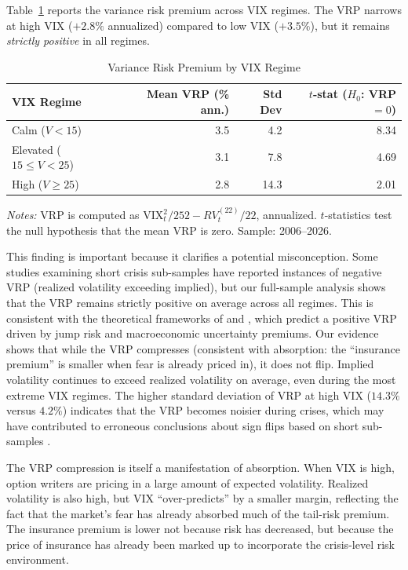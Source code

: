 \documentclass[12pt,a4paper]{article}
\begin{document}
Table~\ref{tab:vrp} reports the variance risk premium across VIX regimes. The VRP narrows at high VIX ($+2.8\%$ annualized) compared to low VIX ($+3.5\%$), but it remains \textit{strictly positive} in all regimes.

\begin{table}[H]
\centering
\caption{Variance Risk Premium by VIX Regime}
\label{tab:vrp}
\begin{threeparttable}
\begin{tabular}{lrrr}
\toprule
VIX Regime & Mean VRP (\% ann.) & Std Dev & $t$-stat ($H_0$: VRP $= 0$) \\
\midrule
Calm ($V < 15$)         & 3.5 & 4.2 & 8.34 \\
Elevated ($15 \leq V < 25$) & 3.1 & 7.8 & 4.69 \\
High ($V \geq 25$)      & 2.8 & 14.3 & 2.01 \\
\bottomrule
\end{tabular}
\begin{tablenotes}
\small
\item \textit{Notes:} VRP is computed as $\text{VIX}_t^2 / 252 - RV_t^{(22)} / 22$, annualized. $t$-statistics test the null hypothesis that the mean VRP is zero. Sample: 2006--2026.
\end{tablenotes}
\end{threeparttable}
\end{table}

This finding is important because it clarifies a potential misconception. Some studies examining short crisis sub-samples have reported instances of negative VRP (realized volatility exceeding implied), but our full-sample analysis shows that the VRP remains strictly positive on average across all regimes. This is consistent with the theoretical frameworks of \citet{todorov2010} and \citet{drechsler2011}, which predict a positive VRP driven by jump risk and macroeconomic uncertainty premiums. Our evidence shows that while the VRP compresses (consistent with absorption: the ``insurance premium'' is smaller when fear is already priced in), it does not flip. Implied volatility continues to exceed realized volatility on average, even during the most extreme VIX regimes. The higher standard deviation of VRP at high VIX ($14.3\%$ versus $4.2\%$) indicates that the VRP becomes noisier during crises, which may have contributed to erroneous conclusions about sign flips based on short sub-samples \citep[see also][for discussion of time-varying risk appetite]{bekaert2022}.

The VRP compression is itself a manifestation of absorption. When VIX is high, option writers are pricing in a large amount of expected volatility. Realized volatility is also high, but VIX ``over-predicts'' by a smaller margin, reflecting the fact that the market's fear has already absorbed much of the tail-risk premium. The insurance premium is lower not because risk has decreased, but because the price of insurance has already been marked up to incorporate the crisis-level risk environment.
\end{document}
